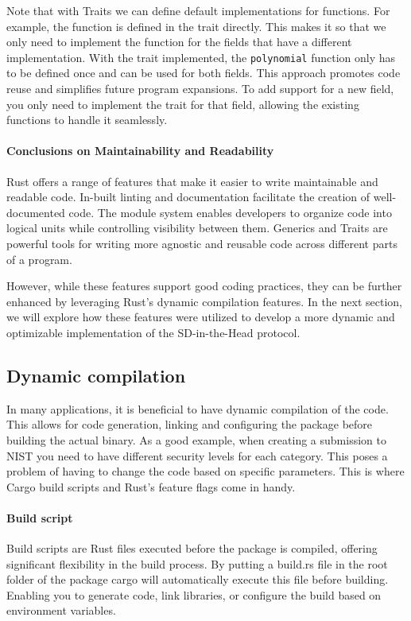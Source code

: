\documentclass[11pt]{report}
\theoremstyle{definition}
\theoremstyle{plain}
\begin{document}
Note that with Traits we can define default implementations for functions. For example, the  function is defined in the trait directly. This makes it so that we only need to implement the function for the fields that have a different implementation. With the trait implemented, the \texttt{polynomial} function only has to be defined once and can be used for both fields. This approach promotes code reuse and simplifies future program expansions. To add support for a new field, you only need to implement the  trait for that field, allowing the existing functions to handle it seamlessly.

\paragraph{Conclusions on Maintainability and Readability}
Rust offers a range of features that make it easier to write maintainable and readable code. In-built linting and documentation facilitate the creation of well-documented code. The module system enables developers to organize code into logical units while controlling visibility between them. Generics and Traits are powerful tools for writing more agnostic and reusable code across different parts of a program.

However, while these features support good coding practices, they can be further enhanced by leveraging Rust's dynamic compilation features. In the next section, we will explore how these features were utilized to develop a more dynamic and optimizable implementation of the SD-in-the-Head protocol.

\subsection{Dynamic compilation}
In many applications, it is beneficial to have dynamic compilation of the code. This allows for code generation, linking and configuring the package before building the actual binary. As a good example, when creating a submission to NIST you need to have different security levels for each category. This poses a problem of having to change the code based on specific parameters. This is where Cargo build scripts and Rust's feature flags come in handy.

\paragraph{Build script}
Build scripts are Rust files executed before the package is compiled, offering significant flexibility in the build process. By putting a build.rs file in the root folder of the package cargo will automatically execute this file before building. Enabling you to generate code, link libraries, or configure the build based on environment variables.
\end{document}

